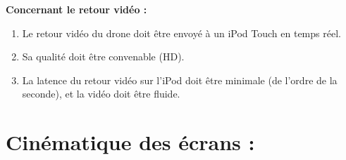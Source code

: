 \documentclass{article}
\begin{document}
	    \begin{flushleft}
	        \textbf{Concernant le retour vidéo :}
	    \end{flushleft}
	     \begin{enumerate}
	     \item	Le retour vidéo du drone doit être envoyé à un iPod Touch en temps réel.
	     \item	Sa qualité doit être convenable (HD).
		 \item La latence du retour vidéo sur l'iPod doit être minimale (de l'ordre de la seconde), et la vidéo doit être fluide.
		 \end{enumerate}
		 
\section{Cinématique des écrans :}
\end{document}
